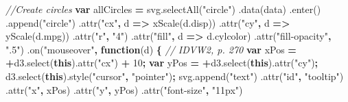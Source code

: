 \documentclass[openany]{book}
\newenvironment{Shaded}{\begin{snugshade}}{\end{snugshade}}
\newcommand{\AttributeTok}[1]{\textcolor[rgb]{0.77,0.63,0.00}{#1}}
\newcommand{\CommentTok}[1]{\textcolor[rgb]{0.56,0.35,0.01}{\textit{#1}}}
\newcommand{\DecValTok}[1]{\textcolor[rgb]{0.00,0.00,0.81}{#1}}
\newcommand{\KeywordTok}[1]{\textcolor[rgb]{0.13,0.29,0.53}{\textbf{#1}}}
\newcommand{\NormalTok}[1]{#1}
\newcommand{\OperatorTok}[1]{\textcolor[rgb]{0.81,0.36,0.00}{\textbf{#1}}}
\newcommand{\StringTok}[1]{\textcolor[rgb]{0.31,0.60,0.02}{#1}}
\newcommand{\VariableTok}[1]{\textcolor[rgb]{0.00,0.00,0.00}{#1}}
\begin{document}
\begin{Shaded}
\begin{Highlighting}[]
    \CommentTok{//Create circles}
    \KeywordTok{var}\NormalTok{ allCircles }\OperatorTok{=} \VariableTok{svg}\NormalTok{.}\AttributeTok{selectAll}\NormalTok{(}\StringTok{"circle"}\NormalTok{)}
\NormalTok{      .}\AttributeTok{data}\NormalTok{(data)}
\NormalTok{      .}\AttributeTok{enter}\NormalTok{()}
\NormalTok{      .}\AttributeTok{append}\NormalTok{(}\StringTok{"circle"}\NormalTok{)}
\NormalTok{      .}\AttributeTok{attr}\NormalTok{(}\StringTok{"cx"}\OperatorTok{,}\NormalTok{ d }\OperatorTok{=>} \AttributeTok{xScale}\NormalTok{(}\VariableTok{d}\NormalTok{.}\AttributeTok{disp}\NormalTok{))}
\NormalTok{      .}\AttributeTok{attr}\NormalTok{(}\StringTok{"cy"}\OperatorTok{,}\NormalTok{ d }\OperatorTok{=>} \AttributeTok{yScale}\NormalTok{(}\VariableTok{d}\NormalTok{.}\AttributeTok{mpg}\NormalTok{))}
\NormalTok{      .}\AttributeTok{attr}\NormalTok{(}\StringTok{"r"}\OperatorTok{,} \StringTok{"4"}\NormalTok{)}
\NormalTok{      .}\AttributeTok{attr}\NormalTok{(}\StringTok{"fill"}\OperatorTok{,}\NormalTok{ d }\OperatorTok{=>} \VariableTok{d}\NormalTok{.}\AttributeTok{cylcolor}\NormalTok{)}
\NormalTok{      .}\AttributeTok{attr}\NormalTok{(}\StringTok{"fill-opacity"}\OperatorTok{,} \StringTok{".5"}\NormalTok{)}
\NormalTok{      .}\AttributeTok{on}\NormalTok{(}\StringTok{"mouseover"}\OperatorTok{,} \KeywordTok{function}\NormalTok{(d) }\OperatorTok{\{} \CommentTok{// IDVW2, p. 270}
        \KeywordTok{var}\NormalTok{ xPos }\OperatorTok{=} \OperatorTok{+}\VariableTok{d3}\NormalTok{.}\AttributeTok{select}\NormalTok{(}\KeywordTok{this}\NormalTok{).}\AttributeTok{attr}\NormalTok{(}\StringTok{"cx"}\NormalTok{) }\OperatorTok{+} \DecValTok{10}\OperatorTok{;}
        \KeywordTok{var}\NormalTok{ yPos }\OperatorTok{=} \OperatorTok{+}\VariableTok{d3}\NormalTok{.}\AttributeTok{select}\NormalTok{(}\KeywordTok{this}\NormalTok{).}\AttributeTok{attr}\NormalTok{(}\StringTok{"cy"}\NormalTok{)}\OperatorTok{;}
        \VariableTok{d3}\NormalTok{.}\AttributeTok{select}\NormalTok{(}\KeywordTok{this}\NormalTok{).}\AttributeTok{style}\NormalTok{(}\StringTok{"cursor"}\OperatorTok{,} \StringTok{"pointer"}\NormalTok{)}\OperatorTok{;}
        \VariableTok{svg}\NormalTok{.}\AttributeTok{append}\NormalTok{(}\StringTok{"text"}\NormalTok{)}
\NormalTok{          .}\AttributeTok{attr}\NormalTok{(}\StringTok{"id"}\OperatorTok{,} \StringTok{"tooltip"}\NormalTok{)}
\NormalTok{          .}\AttributeTok{attr}\NormalTok{(}\StringTok{"x"}\OperatorTok{,}\NormalTok{ xPos)}
\NormalTok{          .}\AttributeTok{attr}\NormalTok{(}\StringTok{"y"}\OperatorTok{,}\NormalTok{ yPos)}
\NormalTok{          .}\AttributeTok{attr}\NormalTok{(}\StringTok{"font-size"}\OperatorTok{,} \StringTok{"11px"}\NormalTok{)}

\end{Highlighting}
\end{Shaded}
\end{document}
